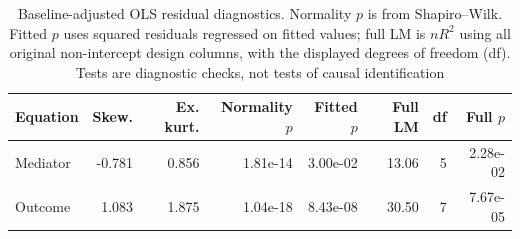 \begin{table}[htbp]
\centering
\caption{Baseline-adjusted OLS residual diagnostics. Normality $p$ is from Shapiro--Wilk. Fitted $p$ uses squared residuals regressed on fitted values; full LM is $nR^2$ using all original non-intercept design columns, with the displayed degrees of freedom (df). Tests are diagnostic checks, not tests of causal identification}
\label{tab:application_diagnostics}
\small
\begin{tabular}{lrrrrrrr}
\toprule
Equation & Skew. & Ex. kurt. & Normality $p$ & Fitted $p$ & Full LM & df & Full $p$ \\
\midrule
Mediator & -0.781 & 0.856 & 1.81e-14 & 3.00e-02 & 13.06 & 5 & 2.28e-02 \\
Outcome & 1.083 & 1.875 & 1.04e-18 & 8.43e-08 & 30.50 & 7 & 7.67e-05 \\
\bottomrule
\end{tabular}
\end{table}
